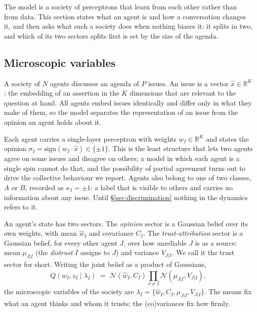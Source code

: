 \documentclass{article}
\begin{document}
The model is a society of perceptrons that learn from each other rather than from
data. This section states what an agent is and how a conversation changes it, and
then asks what such a society does when nothing biases it: it splits in two, and
which of its two sectors splits first is set by the size of the agenda.

\subsection{Microscopic variables}
\label{sec:micro}

A society of $N$ agents discusses an agenda of $P$ issues. An issue is a vector
$\hat{x}\in\mathbb{R}^{K}$: the embedding of an assertion in the $K$ dimensions
that are relevant to the question at hand. All agents embed issues identically and
differ only in what they make of them, so the model separates the representation of
an issue from the opinion an agent holds about it.

Each agent carries a single-layer perceptron with weights $w_I\in\mathbb{R}^{K}$
and states the opinion $\sigma_I = \mathrm{sign}(w_I\cdot\hat{x})\in\{\pm 1\}$.
This is the least structure that lets two agents agree on some issues and disagree
on others; a model in which each agent is a single spin cannot do that, and the
possibility of partial agreement turns out to drive the collective behaviour we
report. Agents also belong to one of two classes, $A$ or $B$, recorded as
$\kappa_I=\pm1$: a label that is visible to others and carries no information about
any issue. Until \S\ref{sec:discrimination} nothing in the dynamics refers to it.

An agent's state has two sectors. The \emph{opinion} sector is a Gaussian belief
over its own weights, with mean $\hat{w}_I$ and covariance $C_I$. The
\emph{trust-attribution} sector is a Gaussian belief, for every other agent $J$,
over how unreliable $J$ is as a source: mean $\mu_{J|I}$ (the \emph{distrust} $I$
assigns to $J$) and variance $V_{J|I}$. We call it the trust sector for short. Writing the joint belief as a product of Gaussians,
%
\begin{equation}
  Q(w_I, z_I \mid \lambda_I) \;=\; \mathcal{N}(\hat{w}_I, C_I)
  \prod_{J\neq I}\mathcal{N}(\mu_{J|I}, V_{J|I}),
  \label{eq:belief}
\end{equation}
%
the microscopic variables of the society are
$\lambda_I=\{\hat{w}_I, C_I, \mu_{J|I}, V_{J|I}\}$. The means fix what an agent
thinks and whom it trusts; the (co)variances fix how firmly.
\end{document}
